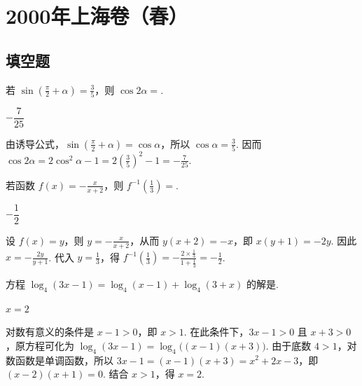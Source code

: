 
\chapter{2000年上海卷（春）}
\section{填空题}
\begin{problem}
若 \(\sin \left(\frac{\pi}{2} + \alpha\right) = \frac{3}{5}\)，则 \(\cos 2\alpha =\)\fillinblank{}.
\end{problem}

\begin{answer}
\(-\dfrac{7}{25}\)
\end{answer}

\begin{solution}
由诱导公式，\(\sin\left(\frac{\pi}{2}+\alpha\right)=\cos\alpha\)，所以 \(\cos\alpha=\frac35\). 因而
\(\cos2\alpha=2\cos^2\alpha-1=2\left(\frac35\right)^2-1=-\frac7{25}\).
\end{solution}

\begin{problem}
若函数 \(f(x)=-\frac{x}{x+2}\)，则 \(f^{-1}\left(\frac{1}{3}\right) = \)\fillinblank{}.
\end{problem}

\begin{answer}
\(-\dfrac12\)
\end{answer}

\begin{solution}
设 \(f(x)=y\)，则 \(y=-\frac{x}{x+2}\)，从而 \(y(x+2)=-x\)，即 \(x(y+1)=-2y\). 因此
\(x=-\frac{2y}{y+1}\). 代入 \(y=\frac13\)，得
\(f^{-1}\left(\frac13\right)=-\frac{2\times\frac13}{1+\frac13}=-\frac12\).
\end{solution}

\begin{problem}
方程 \(\log_{4}(3x-1)=\log_{4}(x-1)+\log_{4}(3+x)\) 的解是\fillinblank{}.
\end{problem}

\begin{answer}
\(x=2\)
\end{answer}

\begin{solution}
对数有意义的条件是 \(x-1>0\)，即 \(x>1\). 在此条件下，\(3x-1>0\) 且 \(x+3>0\)，原方程可化为
\(\log_4(3x-1)=\log_4\bigl((x-1)(x+3)\bigr)\). 由于底数 \(4>1\)，对数函数是单调函数，所以
\(3x-1=(x-1)(x+3)=x^2+2x-3\)，即 \((x-2)(x+1)=0\). 结合 \(x>1\)，得 \(x=2\).
\end{solution}

